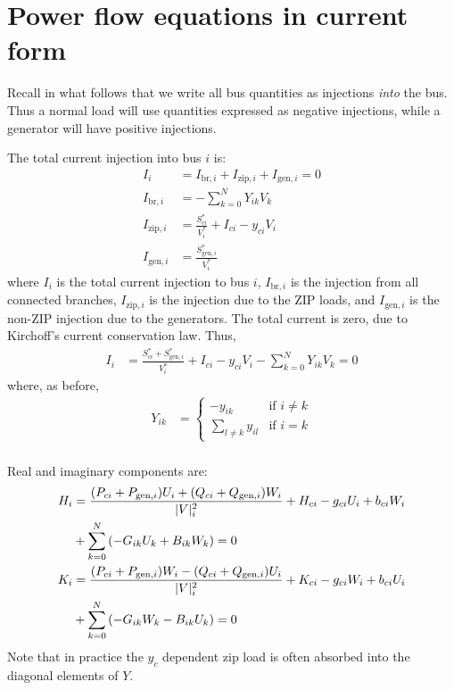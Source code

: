 \documentclass[11pt]{article}
\newcommand{\Vr}{\ensuremath{U}}
\newcommand{\Vi}{\ensuremath{W}}
\newcommand{\Ir}{\ensuremath{H}}
\newcommand{\Ii}{\ensuremath{K}}
\begin{document}
\section{Power flow equations in current form}
Recall in what follows that we write all bus quantities as injections \emph{into} the bus. Thus a normal load will use quantities expressed as negative injections, while a generator will have positive injections.

The total current injection into bus $i$ is:
\begin{align}
I_i &= I_{\text{br}, i} + I_{\text{zip},i} + I_{\text{gen}, i} = 0\\
I_{\text{br},i} &= -\sum_{k=0}^NY_{ik}V_k \\
I_{\text{zip},i} &= \frac{S^*_{ci}}{V^*_i} + I_{ci} - y_{ci}V_i \\
I_{\text{gen},i} &= \frac{S^*_{\text{gen},i}}{V^*_i}
\end{align}
where $I_i$ is the total current injection to bus $i$, $I_{\text{br},i}$ is the injection from all connected branches, $I_{\text{zip},i}$ is the injection due to the ZIP loads, and $I_{\text{gen},i}$ is the non-ZIP injection due to the generators.
The total current is zero, due to Kirchoff's current conservation law. Thus,
\begin{align}
I_i &= \frac{S^*_{ci} + S^*_{\text{gen},i}}{V^*_i} + I_{ci} - y_{ci}V_i - \sum_{k=0}^NY_{ik}V_k = 0
\label{EQ_POWERFLOW_COMPLEX}
\end{align}
where, as before,
\begin{align}
	Y_{ik} &=
		\begin{cases}
			-y_{ik}&\text{if $i \ne k$} \\
			\sum_{l \ne k} y_{il}& \text{if $i = k$}
		\end{cases} \\
\end{align}


Real and imaginary components are:
\begin{align}
	\Ir_i &= \frac{(P_{ci} + P_{\text{gen},i})\Vr_i + (Q_{ci} + Q_{\text{gen},i})\Vi_i}{|V|^2_i} + \Ir_{ci} -g_{ci}\Vr_i + b_{ci}\Vi_i \notag \\
	&+ \sum_{k=0}^N\left(-G_{ik}\Vr_k + B_{ik}\Vi_k\right) = 0\\
	\Ii_i &= \frac{(P_{ci} + P_{\text{gen},i})\Vi_i - (Q_{ci} + Q_{\text{gen},i})\Vr_i}{|V|^2_i} + \Ii_{ci} -g_{ci}\Vi_i + b_{ci}\Vr_i \notag \\
	&+ \sum_{k=0}^N\left(-G_{ik}\Vi_k - B_{ik}\Vr_k\right) = 0
\end{align}
Note that in practice the $y_c$ dependent zip load is often absorbed into the diagonal elements of $Y$.
\end{document}
